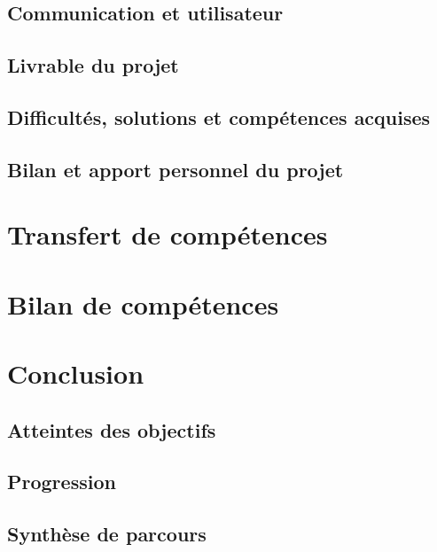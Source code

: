 \documentclass[12pt,a4paper]{report}
\begin{document}
\subsection{Communication et utilisateur}
\subsection{Livrable du projet}
\subsection{Difficultés, solutions et compétences acquises}
\subsection{Bilan et apport personnel du projet}

\newpage
\section{Transfert de compétences}

\newpage
\section{Bilan de compétences}

\newpage
\section{Conclusion}
\subsection{Atteintes des objectifs}
\subsection{Progression}
\subsection{Synthèse de parcours}
\end{document}
